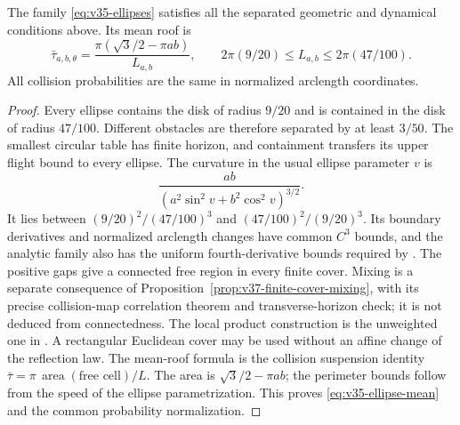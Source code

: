 \begin{lemma}
\label{lem:v35-ellipse-geometry}
The family \eqref{eq:v35-ellipses} satisfies all the separated
geometric and dynamical conditions above. Its mean roof is
\begin{equation}\label{eq:v35-ellipse-mean}
 \bar\tau_{a,b,\theta}
       =\frac{\pi(\sqrt3/2-\pi ab)}{L_{a,b}},\qquad
 2\pi(9/20)\le L_{a,b}\le2\pi(47/100).
\end{equation}
All collision probabilities are the same in normalized arclength
coordinates.
\end{lemma}
\begin{proof}
Every ellipse contains the disk of radius $9/20$ and is contained in
the disk of radius $47/100$. Different obstacles are therefore
separated by at least $3/50$. The smallest circular table has finite
horizon, and containment transfers its upper flight bound to every
ellipse. The curvature in the usual ellipse parameter $v$ is
\[
 \frac{ab}{(a^2\sin^2v+b^2\cos^2v)^{3/2}}.
\]
It lies between $(9/20)^2/(47/100)^3$ and
$(47/100)^2/(9/20)^3$. Its boundary derivatives and normalized
arclength changes have common $C^3$ bounds, and the analytic family
also has the uniform fourth-derivative bounds required by \cite{SYZ}.
The positive gaps give a connected free region in every finite cover.
Mixing is a separate consequence of
Proposition~\ref{prop:v37-finite-cover-mixing}, with its precise
collision-map correlation theorem and transverse-horizon check; it is
not deduced from connectedness. The local product construction is the
unweighted one in \cite[Section 8]{Young}. A rectangular Euclidean
cover may be used without an affine change of the reflection law.
The mean-roof
formula is the collision suspension identity
$\bar\tau=\pi\,\operatorname{area}(\text{free cell})/L$.
The area is $\sqrt3/2-\pi ab$; the perimeter bounds follow from the
speed of the ellipse parametrization. This proves
\eqref{eq:v35-ellipse-mean} and the common probability normalization.


\end{proof}
